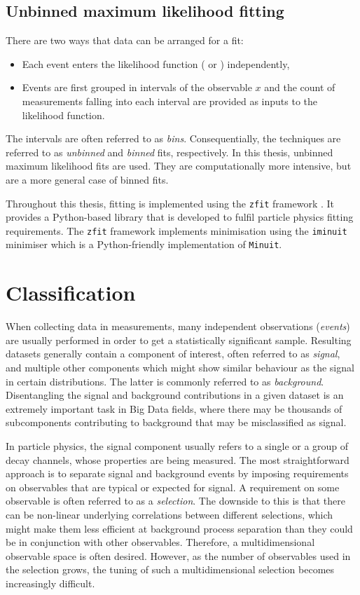 \subsection{Unbinned maximum likelihood fitting}

There are two ways that data can be arranged for a fit: 

\begin{itemize}
    \item Each event enters the likelihood function ( or ) independently,
    \item Events are first grouped in intervals of the observable $x$ and the count of measurements falling into each interval are provided as inputs to the likelihood function.
\end{itemize}
The intervals are often referred to as \textit{bins}. 
Consequentially, the techniques are referred to as \textit{unbinned} and \textit{binned} fits, respectively.
In this thesis, unbinned maximum likelihood fits are used. 
They are computationally more intensive, but are a more general case of binned fits. 

Throughout this thesis, fitting is implemented using the \texttt{zfit} framework \cite{ESCHLE2020100508}. 
It provides a Python-based library that is developed to fulfil particle physics fitting requirements.
The \texttt{zfit} framework implements minimisation using the \texttt{iminuit} minimiser \cite{iminuit} which is a Python-friendly implementation of \texttt{Minuit}.

\section{Classification}\label{sec:classification}
When collecting data in measurements, many independent observations (\textit{events}) are usually performed in order to get a statistically significant sample.
Resulting datasets generally contain a component of interest, often referred to as \textit{signal}, and multiple other components which might show similar behaviour as the signal in certain distributions. 
The latter is commonly referred to as \textit{background}. Disentangling the signal and background contributions in a given dataset is an extremely important task in Big Data fields, where there may be thousands of subcomponents contributing to background that may be misclassified as signal.

In particle physics, the signal component usually refers to a single or a group of decay channels, whose properties are being measured. 
The most straightforward approach is to separate signal and background events by imposing requirements on observables that are typical or expected for signal.
A requirement on some observable is often referred to as a \textit{selection}.
The downside to this is that there can be non-linear underlying correlations between different selections, which might make them less efficient at background process separation than they could be in conjunction with other observables. 
Therefore, a multidimensional observable space is often desired.
However, as the number of observables used in the selection grows, the tuning of such a multidimensional selection becomes increasingly difficult.


